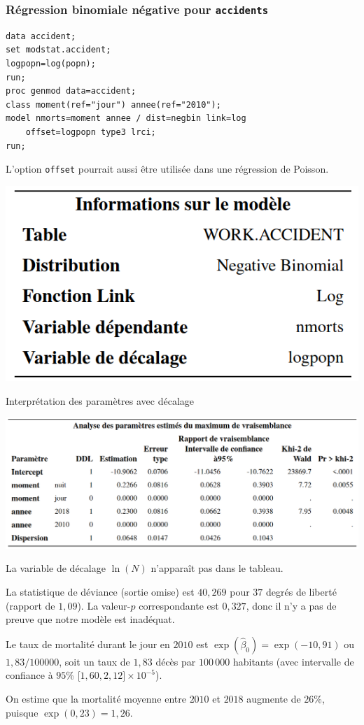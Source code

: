 \documentclass{beamer}
\begin{document}
\begin{frame}[fragile]
\frametitle{Régression binomiale négative pour \texttt{accidents}}

\begin{tcolorbox}[colback=white, colframe=hecblue, title=Code \SASlang{} pour inclure un terme de décalage]
{\small
\begin{verbatim}
data accident;
set modstat.accident;
logpopn=log(popn);
run;
proc genmod data=accident;
class moment(ref="jour") annee(ref="2010");
model nmorts=moment annee / dist=negbin link=log 
    offset=logpopn type3 lrci;
run;
\end{verbatim}
}
\end{tcolorbox}
{\footnotesize 

L'option \texttt{offset} pourrait aussi être utilisée dans une régression de Poisson.



}
\begin{center}
 \includegraphics[width = 0.4\linewidth]{img/c4/diapos8-e9}
\end{center}

\end{frame}
\begin{frame}{Interprétation  des paramètres avec décalage}
\begin{center}
 \includegraphics[width = 0.99\linewidth]{img/c4/diapos8-e10}
\end{center}
{\small 
\bi \item La variable de décalage $\ln(N)$ n'apparaît pas dans le tableau.
\item La statistique de déviance (sortie omise) est $40,269$ pour $37$ degrés de liberté (rapport de $1,09$). La valeur-$p$ correspondante est $0,327$, donc il n'y a pas de preuve que notre modèle est inadéquat.
\item Le taux de mortalité durant le jour en $2010$ est $\exp(\hat{\beta}_0)=\exp(-10,91)$ ou $1,83/100000$, soit un taux de $1,83$ décès par $100\,000$ habitants (avec intervalle de confiance à $95$\%  [$1,60, 2,12]\times 10^{-5}$).
\item On estime que la mortalité moyenne entre $2010$ et $2018$ augmente de $26$\%, puisque $\exp(0,23)=1,26$.
\ei
}
\end{frame}
\end{document}
